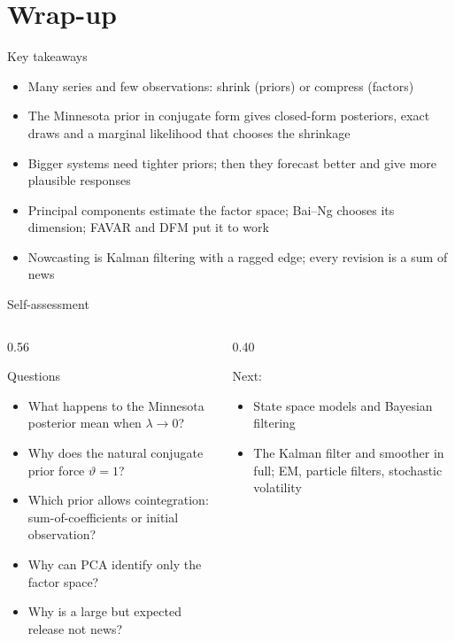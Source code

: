 \section{Wrap-up}

\begin{frame}{Key takeaways}
\itemsize{\small}
\begin{itemize}
    \item Many series and few observations: shrink (priors) or compress (factors)
    \item The Minnesota prior in conjugate form gives closed-form posteriors, exact draws and a marginal likelihood that chooses the shrinkage
    \item Bigger systems need tighter priors; then they forecast better and give more plausible responses
    \item Principal components estimate the factor space; Bai--Ng chooses its dimension; FAVAR and DFM put it to work
    \item Nowcasting is Kalman filtering with a ragged edge; every revision is a sum of news
\end{itemize}
\end{frame}

\begin{frame}{Self-assessment}
\itemsize{\small}
\begin{columns}[T]
\begin{column}{0.56\textwidth}
\begin{block}{Questions}
\begin{itemize}
    \item What happens to the Minnesota posterior mean when $\lambda \to 0$?
    \item Why does the natural conjugate prior force $\vartheta = 1$?
    \item Which prior allows cointegration: sum-of-coefficients or initial observation?
    \item Why can PCA identify only the factor space?
    \item Why is a large but expected release not news?
\end{itemize}
\end{block}
\end{column}
\begin{column}{0.40\textwidth}
\begin{block}{Next: }
\begin{itemize}
    \item State space models and Bayesian filtering
    \item The Kalman filter and smoother in full; EM, particle filters, stochastic volatility
\end{itemize}
\end{block}
\end{column}
\end{columns}
\end{frame}


